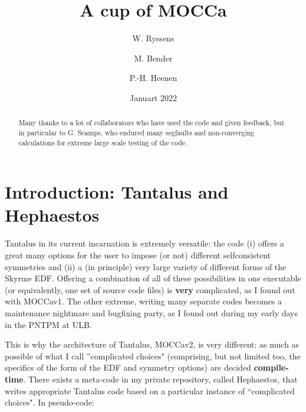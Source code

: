 \documentclass[print,amsmath,amssymb,aps,prc,nofootinbib,notitlepage]{revtex4-1}
\begin{document}
\author{W. Ryssens}


\author{M. Bender}
\author{P.-H. Heenen}
    
\date{Januart 2022}
\title{A cup of MOCCa}

\begin{abstract}
Many thanks to a lot of collaborators who have used the code and given feedback, 
but in particular to G. Scamps, who endured many segfaults and non-converging 
calculations for extreme large scale testing of the code.
\end{abstract}

\maketitle

\setlength{\parindent}{0pt}

\section{Introduction: Tantalus and Hephaestos}

Tantalus in its current incarnation is extremely versatile: the code (i) offers a
great many options for the user to impose (or not) different selfconsistent 
symmetries and (ii) a (in principle) very large variety of different forms of 
the Skyrme EDF. Offering a combination of all of these possibilities in one 
executable (or equivalently, one set of source code files) is \textbf{very}
complicated, as I found out with MOCCav1. The other extreme, writing many 
separate codes becomes a maintenance nightmare and bugfixing party, as I found
out during my early days in the PNTPM at ULB. 

This is why the architecture of Tantalus, MOCCav2, is very different: as much 
as possible of what I call ''complicated choices" (comprising, but not limited
too, the specifics of the form of the EDF and symmetry options) are decided
\textbf{compile-time}. There exists a meta-code in my private repository, 
called Hephaestos, that writes appropriate Tantalus code based on a particular 
instance of ``complicated choices". In pseudo-code:
\end{document}
